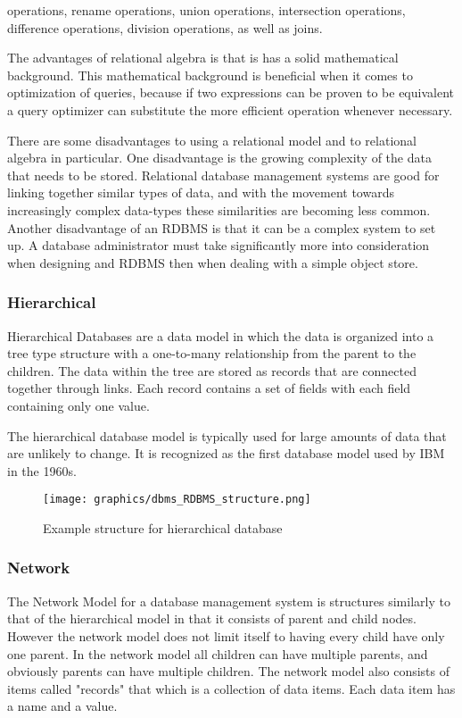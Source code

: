 \documentclass[letterpaper, 12pt]{article}
\begin{document}
operations, rename operations, union operations, intersection operations, difference
operations, division operations, as well as joins.
\par\vspace{\baselineskip}
The advantages of relational algebra is that is has a solid mathematical background.
This mathematical background is beneficial when it comes to optimization of queries,
because if two expressions can be proven to be equivalent a query optimizer can
substitute the more efficient operation whenever necessary.
\par\vspace{\baselineskip}
There are some disadvantages to using a relational model and to relational algebra in
particular. One disadvantage is the growing complexity of the data that needs to be
stored. Relational database management systems are good for linking together similar types
of data, and with the movement towards increasingly complex data-types these similarities
are becoming less common. Another disadvantage of an RDBMS is that it can be a complex
system to set up. A database administrator must take significantly more into consideration
when designing and RDBMS then when dealing with a simple object store.

\subsubsection{Hierarchical}
Hierarchical Databases are a data model in which the data is organized into a tree type
structure with a one-to-many relationship from the parent to the children. The data
within the tree are stored as records that are connected together through links. Each
record contains a set of fields with each field containing only one value.
\par\vspace{\baselineskip}
The hierarchical database model is typically used for large amounts of data that are
unlikely to change. It is recognized as the first database model used by IBM in
the 1960s.\cite{hierarchical_dbms_techopedia}
\par\vspace{\baselineskip}
\begin{figure}
  \centering
  \texttt{[image: graphics/dbms\_RDBMS\_structure.png]}
  \caption{Example structure for hierarchical database}
\end{figure}

\subsubsection{Network}
The Network Model for a database management system is structures similarly to that of the
hierarchical model in that it consists of parent and child nodes. However the network
model does not limit itself to having every child have only one parent. In the network
model all children can have multiple parents, and obviously parents can have multiple
children. The network model also consists of items called "records" that which is a
collection of data items. Each data item has a name and a value.
\end{document}
